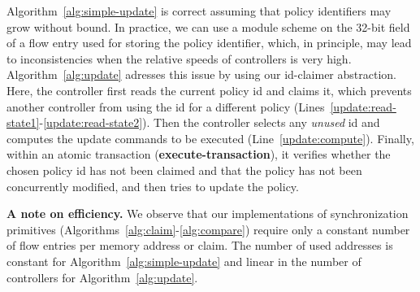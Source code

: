 \documentclass{sig-alternate-2006}
\newcommand{\stefan}[1]{\textit{\textcolor{red}{[stefan]: #1}}} %
\newcommand{\liron}[1]{\textit{\textcolor{mypurple}{[liron]: #1}}} %
\newcommand{\execatomic}{\textbf{execute-transaction}}
\begin{document}
Algorithm~\ref{alg:simple-update} is correct assuming that policy
identifiers may grow without bound. 
In practice, we can use a module scheme on the 32-bit field of a flow entry
used for storing the policy identifier, which, in principle,
may lead to inconsistencies when the relative speeds of controllers is
very high.   
Algorithm~\ref{alg:update} adresses this issue 
by using our id-claimer abstraction.
Here, the controller first reads the current policy id and 
claims it, which prevents another controller from using the id 
for a different policy
(Lines~\ref{update:read-state1}-\ref{update:read-state2}). 
Then the controller selects any \emph{unused} id and computes the update commands to be executed (Line~\ref{update:compute}). %
Finally, within an atomic transaction (\textbf{\execatomic}), it verifies whether the chosen policy id has not
been claimed and that
the policy has not been concurrently modified, and then tries to update the
policy.
%


\vspace{1mm}
\noindent\textbf{A note on efficiency.}
%
We observe that our implementations of synchronization primitives
(Algorithms~\ref{alg:claim}-\ref{alg:compare}) 
require only a constant number of flow entries per memory address or claim.
The number of used addresses is constant for  
Algorithm~\ref{alg:simple-update} and linear in the number of
controllers for Algorithm~\ref{alg:update}. 


\end{document}

